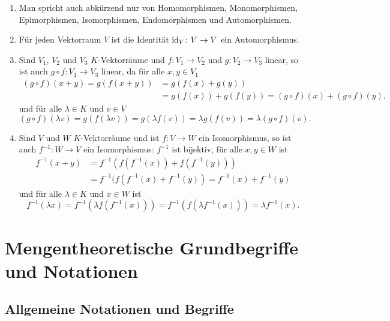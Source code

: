 \begin{bem}
 \begin{enumerate}[leftmargin=*]
  \item
   Man spricht auch abkürzend nur von Homomorphismen, Monomorphismen, Epimorphismen, Isomorphismen, Endomorphismen und Automorphismen.
  \item
   Für jeden Vektorraum $V$ ist die Identität $\mathrm{id}_V \colon V \to V$ ein Automorphismus.
  \item
   Sind $V_1$, $V_2$ und $V_3$ $K$-Vektorräume und $f \colon V_1 \to V_2$ und $g \colon V_2 \to V_3$ linear, so ist auch $g \circ f \colon V_1 \to V_3$ linear, da für alle $x,y \in V_1$
   \begin{align*}
    (g \circ f)(x+y)
    = g(f(x+y))
    &= g(f(x)+g(y)) \\
    &= g(f(x)) + g(f(y))
    = (g \circ f)(x) + (g \circ f)(y),
   \end{align*}
   und für alle $\lambda \in K$ und $v \in V$
   \[
    (g \circ f)(\lambda v)
    = g(f(\lambda v))
    = g(\lambda f(v))
    = \lambda g(f(v))
    = \lambda (g \circ f)(v).
   \]
  \item
   Sind $V$ und $W$ $K$-Vektorräume und ist $f \colon V \to W$ ein Isomorphismus, so ist auch $f^{-1} \colon W \to V$ ein Isomorphismus: $f^{-1}$ ist bijektiv, für alle $x,y \in W$ ist
   \begin{align*}
    f^{-1}(x+y)
    &= f^{-1}( f(f^{-1}(x)) + f(f^{-1}(y)) ) \\
    &= f^{-1}(f( f^{-1}(x) + f^{-1}(y) )
    = f^{-1}(x) + f^{-1}(y)
   \end{align*}
   und für alle $\lambda \in K$ und $x \in W$ ist
   \[
    f^{-1}(\lambda x)
    = f^{-1}(\lambda f(f^{-1}(x)) )
    = f^{-1}(f( \lambda f^{-1}(x)))
    = \lambda f^{-1}(x).
   \]
 \end{enumerate}
\end{bem}





\section{Mengentheoretische Grundbegriffe und Notationen}



\subsection{Allgemeine Notationen und Begriffe}


